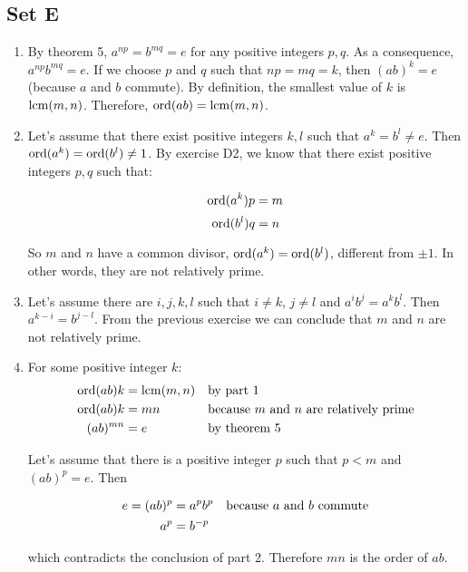\subsection{Set E}
\begin{enumerate}
    \item By theorem 5, $ a^{np} = b^{mq} = e $ for any positive integers $ p, q $. As a consequence, $ a^{np}b^{mq} = e $. If we choose $ p $ and $ q $ such that $ np = mq = k $, then $ (ab)^k = e $ (because $ a $ and $ b $ commute). By definition, the smallest value of $ k $ is $ \operatorname{lcm}(m, n) $. Therefore, $ \operatorname{ord}(ab) = \operatorname{lcm}(m, n) $.    

    \item Let's assume that there exist positive integers $ k, l $ such that $ a^k = b^l \ne e $. Then $ \operatorname{ord}(a^k) = \operatorname{ord}(b^l) \ne 1 $. By exercise D2, we know that there exist positive integers $ p, q $ such that:

    $$ \operatorname{ord}(a^k)p = m $$
    $$ \operatorname{ord}(b^l)q = n $$

    So $ m $ and $ n $ have a common divisor, $ \operatorname{ord}(a^k) = \operatorname{ord}(b^l) $, different from $ \pm 1 $. In other words, they are not relatively prime.

    \item Let's assume there are $ i, j, k, l $ such that $ i \ne k $, $ j \ne l $ and $ a^ib^j = a^kb^l $. Then $ a^{k - i} = b^{j -l} $. From the previous exercise we can conclude that $ m $ and $ n $ are not relatively prime.

    \item For some positive integer $ k $:
        \begin{align*}
            \operatorname{ord}(ab)k &= \operatorname{lcm}(m, n) && \text{by part 1} \\
            \operatorname{ord}(ab)k &= mn && \text{because $ m $ and $ n $ are relatively prime} \\
            (ab)^{mn} &= e && \text{by theorem 5}
        \end{align*}

        Let's assume that there is a positive integer $ p $ such that $  p < m $ and $ (ab)^p = e$. Then

        \begin{align*}
            e = (ab)^p &= a^pb^p && \text{because $ a $ and $ b $ commute} \\
            a^p &= b^{-p}
        \end{align*}

        which contradicts the conclusion of part 2. Therefore $ mn $ is the order of $ ab $.


\end{enumerate}
